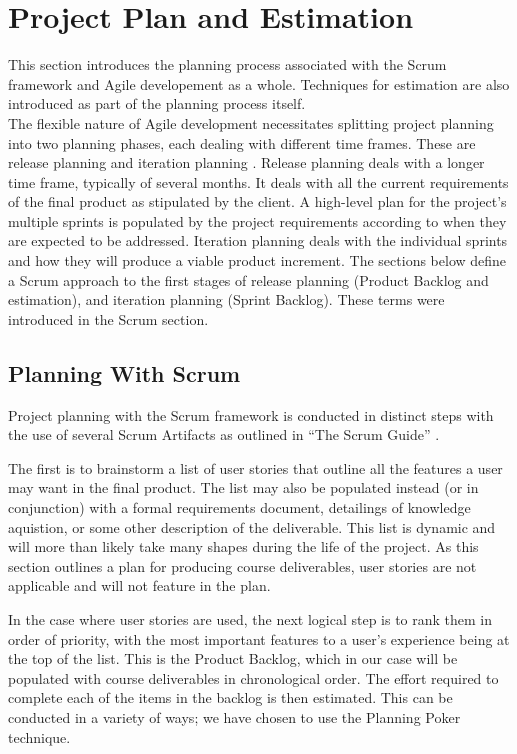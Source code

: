 \section{Project Plan and Estimation} \label{project plan and estimation}

This section introduces the planning process associated with the Scrum framework and Agile developement as a whole. Techniques for estimation are also introduced as part of the planning process itself.\\

The flexible nature of Agile development necessitates splitting project planning into two planning phases, each dealing with different time frames. These are release planning and iteration planning \cite[p.680]{Sommerville}. Release planning deals with a longer time frame, typically of several months. It deals with all the current requirements of the final product as stipulated by the client. A high-level plan for the project’s multiple sprints is populated by the project requirements according to when they are expected to be addressed. Iteration planning deals with the individual sprints and how they will produce a viable product increment. The sections below define a Scrum approach to the first stages of release planning (Product Backlog and estimation), and iteration planning (Sprint Backlog). These terms were introduced in the Scrum section.

\subsection{Planning With Scrum}

Project planning with the Scrum framework is conducted in distinct steps with the use of several Scrum Artifacts as outlined in “The Scrum Guide” \cite{Schwaber}.

The first is to brainstorm a list of user stories \cite{Sommerville} that outline all the features a user may want in the final product. The list may also be populated instead (or in conjunction) with a formal requirements document, detailings of knowledge aquistion, or some other description of the deliverable. This list is dynamic and will more than likely take many shapes during the life of the project. As this section outlines a plan for producing course deliverables, user stories are not applicable and will not feature in the plan.

In the case where user stories are used, the next logical step is to rank them in order of priority, with the most important features to a user’s experience being at the top of the list. This is the Product Backlog, which in our case will be populated with course deliverables in chronological order. The effort required to complete each of the items in the backlog is then estimated. This can be conducted in a variety of ways; we have chosen to use the Planning Poker technique.

